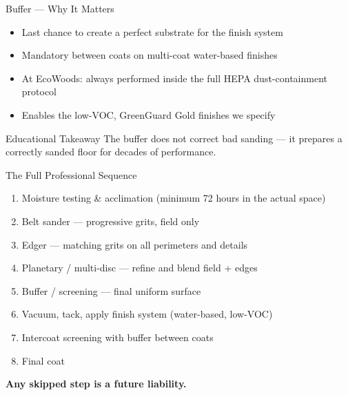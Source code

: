 \documentclass[aspectratio=169,10pt]{beamer}
\begin{document}
\begin{frame}{Buffer — Why It Matters}
\begin{itemize}
  \item Last chance to create a perfect substrate for the finish system
  \item Mandatory between coats on multi-coat water-based finishes
  \item At EcoWoods: always performed inside the full HEPA dust-containment protocol
  \item Enables the low-VOC, GreenGuard Gold finishes we specify
\end{itemize}
\vspace{0.25cm}
\begin{block}{Educational Takeaway}
The buffer does not correct bad sanding — it prepares a correctly sanded floor for decades of performance.
\end{block}
\end{frame}

\begin{frame}{The Full Professional Sequence}
\begin{enumerate}
  \item Moisture testing \& acclimation (minimum 72 hours in the actual space)
  \item Belt sander — progressive grits, field only
  \item Edger — matching grits on all perimeters and details
  \item Planetary / multi-disc — refine and blend field + edges
  \item Buffer / screening — final uniform surface
  \item Vacuum, tack, apply finish system (water-based, low-VOC)
  \item Intercoat screening with buffer between coats
  \item Final coat
\end{enumerate}
\vspace{0.15cm}
\begin{center}
\textbf{Any skipped step is a future liability.}
\end{center}
\end{frame}
\end{document}

